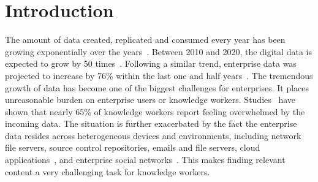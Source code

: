 \section{Introduction} 
\label{sec:introduction}
The amount of data created, replicated and consumed every year has
been growing exponentially over the
years~\cite{IDGBigDataSurvey14}.  Between 2010 and 2020, the digital
data is expected to grow by 50 times~\cite{IDCDataGrowth}.
Following a similar trend, enterprise data was projected to
increase by 76\% within the last one and half
years~\cite{IDCDataGrowth}.  The tremendous growth of data has become one
of the biggest challenges for enterprises.  It places unreasonable
burden on enterprise users or knowledge workers.
Studies~\cite{IDGBigDataSurvey14} have shown that nearly 65\% of
knowledge workers report feeling overwhelmed by the incoming data.
The situation is further exacerbated by the fact the enterprise data
resides across heterogeneous devices and environments, including network
file servers, source control repositories, emails and file servers,
cloud applications~\cite{salesforce, office365}, and enterprise social
networks~\cite{EnterpriseSN}.  This makes finding relevant content a
very challenging task for knowledge workers.



